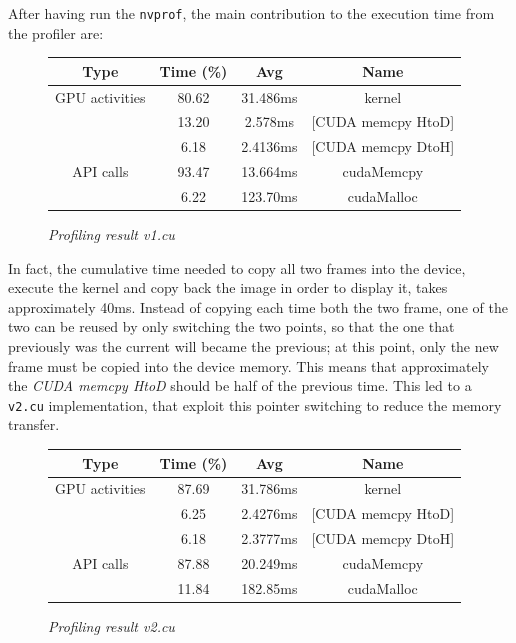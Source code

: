 \documentclass[paper=a4, fontsize=10pt]{scrartcl}	%
\begin{document}
	After having run the \texttt{nvprof}, the main contribution to the execution time from the profiler are:
	\begin{figure}[H]
		\centering
			\begin{center}
			\begin{tabular}{ |c|c|c|c| } 
				\hline
				\textbf{Type} & \textbf{Time} (\%) & \textbf{Avg} & \textbf{Name} \\ 
				\hline
				GPU activities & 80.62 & 31.486ms & kernel \\ 
				& 13.20 & 2.578ms & [CUDA memcpy HtoD] \\ 
				& 6.18 & 2.4136ms & [CUDA memcpy DtoH] \\ 
				\hline
				API calls & 93.47 & 13.664ms & cudaMemcpy \\ 
				& 6.22 & 123.70ms & cudaMalloc \\ 
				\hline
			\end{tabular}
		\end{center}
		\label{fig:table_v1}
		\caption{\textit{Profiling result v1.cu}}
	\end{figure}
	In fact, the cumulative time needed to copy all two frames into the device, execute the kernel and copy back the image in order to display it, takes approximately 40ms.\newline\newline
	Instead of copying each time both the two frame, one of the two can be reused by only switching the two points, so that the one that previously was the current will became the previous; at this point, only the new frame must be copied into the device memory. This means that approximately the \textit{CUDA memcpy HtoD} should be half of the previous time. This led to a \texttt{v2.cu} implementation, that exploit this pointer switching to reduce the memory transfer.
	\begin{figure}[H]
		\centering
		\begin{center}
			\begin{tabular}{ |c|c|c|c| } 
				\hline
				\textbf{Type} & \textbf{Time} (\%) & \textbf{Avg} & \textbf{Name} \\ 
				\hline
				GPU activities & 87.69 & 31.786ms & kernel \\ 
				& 6.25 & 2.4276ms & [CUDA memcpy HtoD] \\ 
				& 6.18 & 2.3777ms & [CUDA memcpy DtoH] \\ 
				\hline
				API calls & 87.88 & 20.249ms & cudaMemcpy \\ 
				& 11.84 & 182.85ms & cudaMalloc \\ 
				\hline
			\end{tabular}
		\end{center}
		\label{fig:table_v2}
		\caption{\textit{Profiling result v2.cu}}
	\end{figure}
\end{document}
